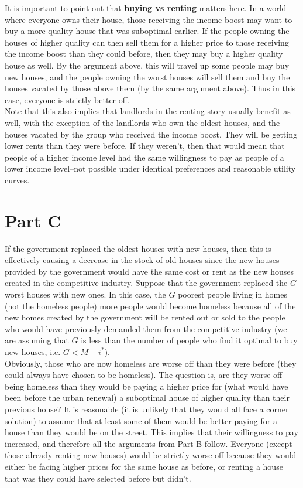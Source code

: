\documentclass[12pt]{paper}
\begin{document}
It is important to point out that \textbf{buying vs renting} matters here. In a world where everyone owns their house, those receiving the income boost may want to buy a more quality house that was suboptimal earlier. If the people owning the houses of higher quality can then sell them for a higher price to those receiving the income boost than they could before, then they may buy a higher quality house as well. By the argument above, this will travel up some people may buy new houses, and the people owning the worst houses will sell them and buy the houses vacated by those above them (by the same argument above). Thus in this case, everyone is strictly better off.\\


Note that this also implies that landlords in the renting story usually benefit as well, with the exception of the landlords who own the oldest houses, and the houses vacated by the group who received the income boost. They will be getting lower rents than they were before. If they weren't, then that would mean that people of a higher income level had the same willingness to pay as people of a lower income level--not possible under identical preferences and reasonable utility curves.\\


\section*{Part C}


If the government replaced the oldest houses with new houses, then this is effectively causing a decrease in the stock of old houses since the new houses provided by the government would have the same cost or rent as the new houses created in the competitive industry. Suppose that the government replaced the $G$ worst houses with new ones. In this case, the $G$ poorest people living in homes (not the homeless people) more people would become homeless because all of the new homes created by the government will be rented out or sold to the people who would have previously demanded them from the competitive industry (we are assuming that $G$ is less than the number of people who find it optimal to buy new houses, i.e. $G<M-i^*$).\\


Obviously, those who are now homeless are worse off than they were before (they could always have chosen to be homeless). The question is, are they worse off being homeless than they would be paying a higher price for (what would have been before the urban renewal) a suboptimal house of higher quality than their previous house? It is reasonable (it is unlikely that they would all face a corner solution) to assume that at least some of them would be better paying for a house than they would be on the street. This implies that their willingness to pay increased, and therefore all the arguments from Part B follow. Everyone (except those already renting new houses) would be strictly worse off because they would either be facing higher prices for the same house as before, or renting a house that was they could have selected before but didn't.\\
\end{document}
